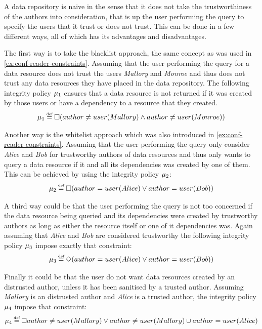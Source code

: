 \begin{example}
A data repository is naive in the sense that it does not take the trustworthiness of the authors into consideration, that is up the user performing the query to specify the users that it trust or does not trust. This can be done in a few different ways, all of which has its advantages and disadvantages.

The first way is to take the blacklist approach, the same concept as was used in \autoref{ex:conf-reader-constraints}. Assuming that the user performing the query for a data resource does not trust the users \emph{Mallory} and \emph{Monroe} and thus does not trust any data resources they have placed in the data repository. The following integrity policy $\mu_1$ ensures that a data resource is not returned if it was created by those users or have a dependency to a resource that they created.
\begin{align*}
    \inte_1 \eqdef \G( author \neq user(Mallory) \land author \neq user(Monroe))
\end{align*}

Another way is the whitelist approach which was also introduced in \autoref{ex:conf-reader-constraints}. Assuming that the user performing the query only consider \emph{Alice} and \emph{Bob} for trustworthy authors of data resources and thus only wants to query a data resource if it and all its dependencies was created by one of them. This can be achieved by using the integrity policy $\mu_2$:
\begin{align*}
    \inte_2 \eqdef \G(author = user(Alice) \lor author = user(Bob))
\end{align*}

A third way could be that the user performing the query is not too concerned if the data resource being queried and its dependencies were created by trustworthy authors as long as either the resource itself or one of it dependencies was. Again assuming that \emph{Alice} and \emph{Bob} are considered trustworthy the following integrity policy $\mu_3$ impose exactly that constraint:
\begin{align*}
    \inte_3 \eqdef \F(author = user(Alice) \lor author = user(Bob))
\end{align*}

Finally it could be that the user do not want data resources created by an distrusted author, unless it has been sanitised by a trusted author. Assuming \emph{Mallory} is an distrusted author and \emph{Alice} is a trusted author, the integrity policy $\mu_4$ impose that constraint:
\begin{align*}
    \inte_4 \eqdef \G author \neq user(Mallory) \lor author \neq user(Mallory) \U author = user(Alice)
\end{align*}
\end{example}